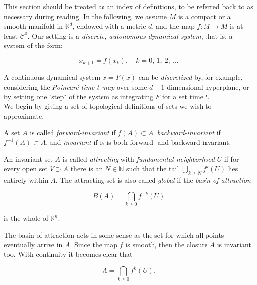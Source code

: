 This section should be treated as an index of definitions, to be referred back to as 
necessary during reading. In the following, we assume $M$ is a compact or a smooth manifold 
in $\mathbb{R}^d$, endowed with a metric $d$, and the 
map $f: M \to M$ is at least $\mathcal{C}^0$. Our setting is a 
\emph{discrete, autonomous dynamical system}, that is, a system of the form:

\begin{equation}
    x_{k+1} = f(x_k), \quad k = 0,\ 1,\ 2,\ \dotsc
\end{equation}

A continuous dynamical system $\dot{x} = F(x)$ can be \emph{discretized} by, for example,
considering the \emph{Poincaré time-$t$ map} over some $d-1$ dimensional hyperplane,
or by setting one "step" of the system as integrating $F$ for a set time $t$. \\

We begin by giving a set of topological definitions of sets we wish to approximate.

\begin{definition}
    \cite*{algGAIO} A set $A$ is called \emph{forward-invariant} if $f(A) \subset A$, 
    \emph{backward-invariant} if $f^{-1}(A) \subset A$, and \emph{invariant} if it is
    both forward- and backward-invariant.
\end{definition}

\begin{definition}
    \cite*{subalg} An invariant set $A$ is called \emph{attracting} with \emph{fundamental neighborhood}
    $U$ if for every open set $V \supset A$ there is an $N \in \mathbb{N}$ such that the tail 
    $\bigcup_{k \geq N} f^k(U)$ lies entirely within $A$. The attracting 
    set is also called \emph{global} if the \emph{basin of attraction} 
    
    \begin{equation}\label{eq:globattr}
        B(A) = \bigcap\limits_{k \geq 0} f^{-k}(U)
    \end{equation}

    is the whole of $\mathbb{R}^n$.
\end{definition}

The basin of attraction acts in some sense as the set for which all points eventually arrive
in $A$. Since the map $f$ is smooth, then the closure $\bar{A}$ is invariant too. With continuity 
it becomes clear that

\begin{equation}
    A = \bigcap\limits_{k \geq 0} f^k(U).
\end{equation}

